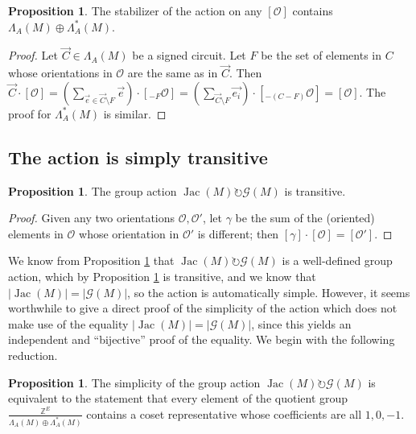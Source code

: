 \documentclass[12pt]{amsart}
\numberwithin{equation}{section}
\theoremstyle{definition}
\newtheorem{proposition}[theorem]{Proposition}
\newcommand{\Jac}{\operatorname{Jac}}
\begin{document}
\begin{proposition} \label{Prop:JacActWD}
The stabilizer of the action on any $[\mathcal{O}]$ contains $\Lambda_A(M)\oplus \Lambda_A^*(M)$.
\end{proposition}

\begin{proof}
Let $\overrightarrow{C}\in \Lambda_A(M)$ be a signed circuit. Let $F$ be the set of elements in $C$ whose orientations in $\mathcal{O}$ are the same as in $\overrightarrow{C}$. Then $\overrightarrow{C}\cdot[\mathcal{O}]=(\sum_{\overrightarrow{e}\in\overrightarrow{C}\setminus F}\overrightarrow{e})\cdot[_{-F}\mathcal{O}]=(\sum_{\overrightarrow{C}\setminus F}\overrightarrow{e_i})\cdot[_{-(C-F)}\mathcal{O}]=[\mathcal{O}]$. The proof for $\Lambda_A^*(M)$ is similar.
\end{proof}

\subsection{The action is simply transitive}

\begin{proposition} \label{Prop:TransTorsor}
The group action $\Jac(M)\circlearrowright\mathcal{G}(M)$ is transitive.
\end{proposition}

\begin{proof}
Given any two orientations $\mathcal{O},\mathcal{O}'$, let $\gamma$ be the sum of the (oriented) elements in $\mathcal{O}$ whose orientation in $\mathcal{O}'$ is different; then $[\gamma]\cdot[\mathcal{O}]=[\mathcal{O}']$. 
\end{proof}

We know from Proposition \ref{Prop:JacActWD} that $\Jac(M)\circlearrowright\mathcal{G}(M)$ is a well-defined group action, which by Proposition \ref{Prop:TransTorsor} is transitive, and we know that $|\Jac(M)|=|\mathcal{G}(M)|$, so the action is automatically simple.  However, it seems worthwhile to give a direct proof of the simplicity of the action which does not make use of the equality $|\Jac(M)|=|\mathcal{G}(M)|$, since this yields an independent and ``bijective'' proof of the equality.  We begin with the following reduction.

\begin{proposition}
The simplicity of the group action $\Jac(M)\circlearrowright\mathcal{G}(M)$ is equivalent to the statement that every element of the quotient group $\frac{\mathbb{Z}^E}{\Lambda_A(M)\oplus \Lambda_A^*(M)}$ contains a coset representative whose coefficients are all $1,0,-1$.
\end{proposition}
\end{document}
